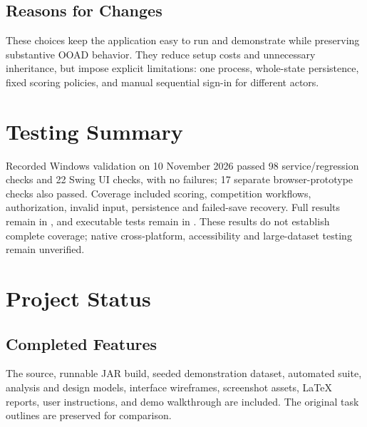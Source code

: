 \documentclass[12pt]{article}
\begin{document}
\subsection{Reasons for Changes}
These choices keep the application easy to run and demonstrate while preserving substantive OOAD behavior. They reduce setup costs and unnecessary inheritance, but impose explicit limitations: one process, whole-state persistence, fixed scoring policies, and manual sequential sign-in for different actors.

\section{Testing Summary}
Recorded Windows validation on 10 November 2026 passed 98 service/regression checks and 22 Swing UI checks, with no failures; 17 separate browser-prototype checks also passed. Coverage included scoring, competition workflows, authorization, invalid input, persistence and failed-save recovery. Full results remain in , and executable tests remain in . These results do not establish complete coverage; native cross-platform, accessibility and large-dataset testing remain unverified.

\section{Project Status}
\subsection{Completed Features}
The source, runnable JAR build, seeded demonstration dataset, automated suite, analysis and design models, interface wireframes, screenshot assets, LaTeX reports, user instructions, and demo walkthrough are included. The original task outlines are preserved for comparison.
\end{document}
